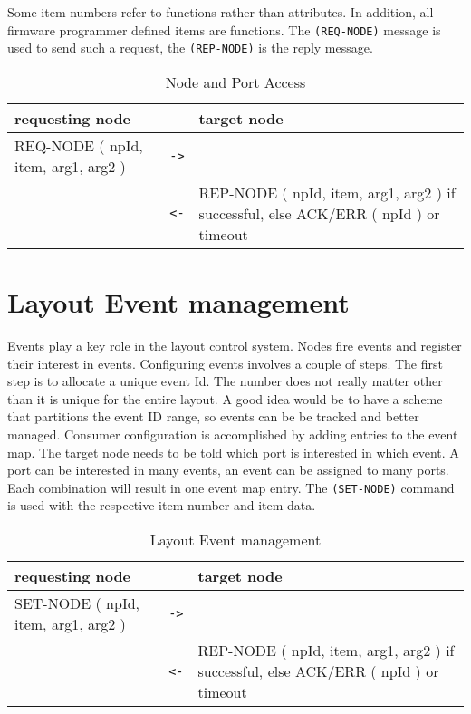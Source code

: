 Some item numbers refer to functions rather than attributes. In addition, all firmware programmer defined items are functions.  The \texttt{(REQ-NODE)} message is used to send such a request, the \texttt{(REP-NODE)} is the reply message.

\begin{table}[ht!]
    \begin{center}
        \caption{Node and Port Access}
        \begin{tabular}{|p{}| c |p{}|}
            \toprule
            \textbf{requesting node} & & \textbf{ target node} \\
            \midrule
            REQ-NODE ( npId, item, arg1, arg2 ) & \texttt{->} &  \\
            \midrule
            & \texttt{<-} & REP-NODE ( npId, item, arg1, arg2 ) if successful, else ACK/ERR ( npId ) or timeout \\
            \bottomrule
        \end{tabular}
    \end{center}
\end{table}


\section{Layout Event management}

Events play a key role in the layout control system. Nodes fire events and register their interest in events. Configuring events involves a couple of steps. The first step is to allocate a unique event Id. The number does not really matter other than it is unique for the entire layout. A good idea would be to have a scheme that partitions the event ID range, so events can be be tracked and better managed. Consumer configuration is accomplished by adding entries to the event map. The target node needs to be told which port is interested in which event. A port can be interested in many events, an event can be assigned to many ports. Each combination will result in one event map entry. The \texttt{(SET-NODE)} command is used with the respective item number and item data.

\begin{table}[ht!]
    \begin{center}
        \caption{Layout Event management}
        \begin{tabular}{|p{}| c |p{}|}
            \toprule
            \textbf{requesting node} & & \textbf{ target node} \\
            \midrule
            SET-NODE ( npId, item, arg1, arg2 ) & \texttt{->} &  \\
            \midrule
            & \texttt{<-} & REP-NODE ( npId, item, arg1, arg2 ) if successful, else ACK/ERR ( npId ) or timeout \\
            \bottomrule
        \end{tabular}
    \end{center}
\end{table}

